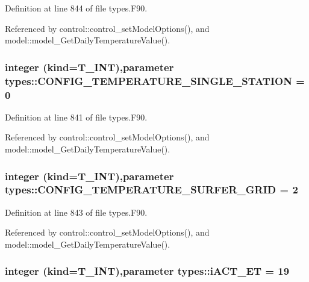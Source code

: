 Definition at line 844 of file types.F90.



Referenced by control::control\_\-setModelOptions(), and model::model\_\-GetDailyTemperatureValue().

\hypertarget{namespacetypes_a821c4b808dde869fec2b125892518a86}{
\subsubsection[{CONFIG\_\-TEMPERATURE\_\-SINGLE\_\-STATION}]{\setlength{\rightskip}{0pt plus 5cm}integer (kind={\bf T\_\-INT}),parameter {\bf types::CONFIG\_\-TEMPERATURE\_\-SINGLE\_\-STATION} = 0}}
\label{namespacetypes_a821c4b808dde869fec2b125892518a86}


Definition at line 841 of file types.F90.



Referenced by control::control\_\-setModelOptions(), and model::model\_\-GetDailyTemperatureValue().

\hypertarget{namespacetypes_af01dca6362f0a51f0e5091ef26571bc8}{
\subsubsection[{CONFIG\_\-TEMPERATURE\_\-SURFER\_\-GRID}]{\setlength{\rightskip}{0pt plus 5cm}integer (kind={\bf T\_\-INT}),parameter {\bf types::CONFIG\_\-TEMPERATURE\_\-SURFER\_\-GRID} = 2}}
\label{namespacetypes_af01dca6362f0a51f0e5091ef26571bc8}


Definition at line 843 of file types.F90.



Referenced by control::control\_\-setModelOptions(), and model::model\_\-GetDailyTemperatureValue().

\hypertarget{namespacetypes_a5d7a9e58cc5060c7fdfc7466a8f52a60}{
\subsubsection[{iACT\_\-ET}]{\setlength{\rightskip}{0pt plus 5cm}integer (kind={\bf T\_\-INT}),parameter {\bf types::iACT\_\-ET} = 19}}
\label{namespacetypes_a5d7a9e58cc5060c7fdfc7466a8f52a60}


